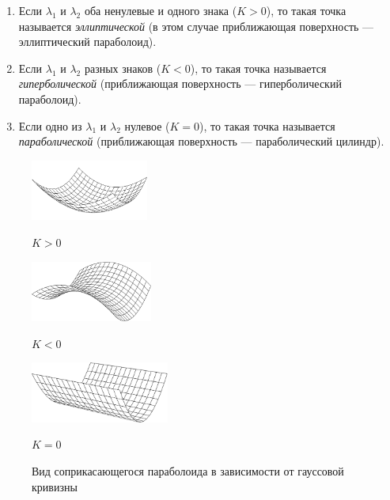 \begin{definition}
	\begin{enumerate}[nolistsep, label=(\arabic*)]
		\item Если $\lambda_1$ и $\lambda_2$ оба ненулевые и одного знака ($K > 0$), то такая точка называется \textit{эллиптической} (в этом случае приближающая поверхность --- эллиптический параболоид).
		\item Если $\lambda_1$ и $\lambda_2$ разных знаков ($K < 0$), то такая точка называется \textit{гиперболической} (приближающая поверхность --- гиперболический параболоид).
		\item Если одно из $\lambda_1$ и $\lambda_2$ нулевое ($K = 0$), то такая точка называется \textit{параболической} (приближающая поверхность --- параболический цилиндр).
	\end{enumerate}
\end{definition}

\begin{figure}[H]
	\centering
	\begin{minipage}{.3\textwidth}
		\centering
		\includegraphics[height=2cm]{./img/Elliptic.pdf}

		$K > 0$
	\end{minipage}
	\begin{minipage}{.3\textwidth}
		\centering
		\includegraphics[height=2cm]{./img/Hyperbolic.pdf}

		$K < 0$
	\end{minipage}
	\begin{minipage}{.3\textwidth}
		\centering
		\includegraphics[height=2cm]{./img/Parabolic.pdf}

		$K = 0$
	\end{minipage}
	\caption{Вид соприкасающегося параболоида в зависимости от гауссовой кривизны}
\end{figure}

